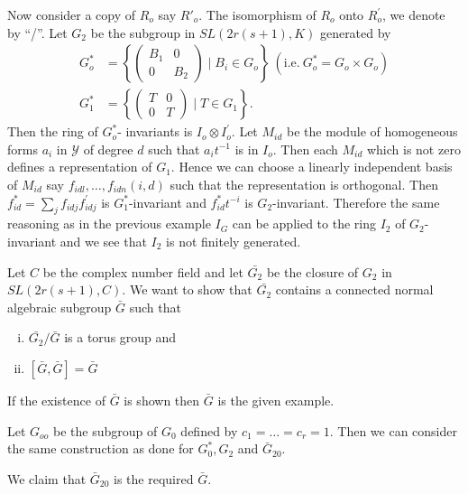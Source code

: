  Now consider a copy of $R_o$ say $R'_{o}$. The isomorphism
 of $R_o$ onto $R_{o}^{\prime}$, we denote by ``/''. Let $ G_2$ be
 the subgroup in $SL (2r(s+1),K)$ generated by 
\begin{align*}
  G_{o}^{\ast} & = \left\{ \begin{pmatrix}  B_{1} & 0 \\  0 &
    B_{2} \end{pmatrix} \mid B_i \in G_o \right\}  ~(\text{i.e.}~
  G_{o}^{\ast} = G_o \times G_o)\\ 
  G_{1}^{\ast} & = \left\{ \begin{pmatrix} T & 0 \\ 0 & T \end{pmatrix}
  \mid T \in G_1 \right\}. 
\end{align*}
Then the ring of $G_{o}^{\ast}$- invariants
 is $ I_o \otimes I_{o}^{\prime}$. Let $M_{id}$ be the module of
 homogeneous forms $ a_i$ in $\mathscr{Y}$ of degree $d$ such that $ a_i
 t^{-1}$ is in $ I_o$. Then each $ M_{id}$ which is not zero defines a
 representation of $G_1$. Hence we can choose a linearly independent
 basis of $M_{id}$ say $f_{idl} , \ldots , f_{idn} (i,d)$ such that
 the representation is orthogonal. Then $ f_{id}^{\ast}= \sum\limits_j
 f_{idj}f_{idj}^{\prime}$ is $G_{1}^{\ast}$-invariant and $
 f_{id}^{\ast}t^{-i}$ is $ G_2$-invariant. Therefore the same
 reasoning as in the previous example $I_G$ can be applied to the
 ring $ I_2$ of $G_2$-invariant and we see that $I_2$ is not
 finitely generated. 
 
 Let $C$ be the complex number field and let $\bar{G_2}$ be the
 closure of $ G_2$ in $SL(2r(s+1),C)$. We want to show that
 $\bar{G_2}$ contains a connected normal algebraic subgroup $
 \bar{G}$ such that 
 \begin{enumerate}[(i)]
 \item $ \bar{G_2}/ \bar{G}$ is a torus group and 

 \item $[\bar{G}, \bar{G}] = \bar{G}$
\end{enumerate}
 
 If the existence of $\bar{G}$ is shown then $\bar{G}$
 is the given example. 
 
 Let ${G}_{oo}$ be the subgroup of $G_0$ defined by $c_1 = \ldots =
 c_r = 1$. Then we can consider the same construction as done for
 $G^*_0,G_2$  and $\bar{G}_{20}$.   
 
 We claim that $\bar{G}_{20}$ is the required $\bar{G}$.

